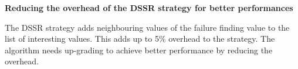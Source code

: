 \textbf{Reducing the overhead of the DSSR strategy for better performances}

The DSSR strategy adds neighbouring values of the failure finding value to the list of interesting values. This adds up to 5\% overhead to the strategy. The algorithm needs up-grading to achieve better performance by reducing the overhead.











